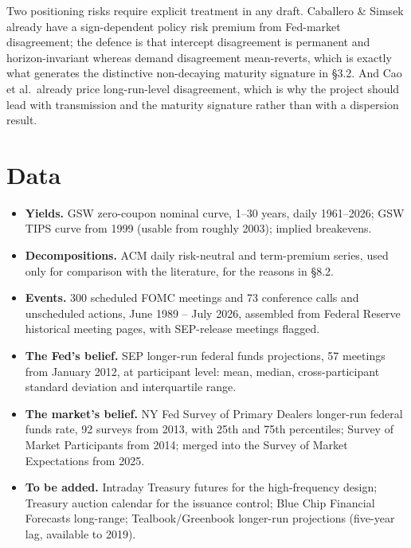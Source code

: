 \documentclass[11pt]{article}
\begin{document}
Two positioning risks require explicit treatment in any draft. Caballero \& Simsek already have
a sign-dependent policy risk premium from Fed-market disagreement; the defence is that
intercept disagreement is permanent and horizon-invariant whereas demand disagreement
mean-reverts, which is exactly what generates the distinctive non-decaying maturity signature
in \S3.2. And Cao et al.\ already price long-run-level disagreement, which is why the project
should lead with transmission and the maturity signature rather than with a dispersion result.

\section{Data}

\begin{itemize}\setlength\itemsep{0.1em}
\item \textbf{Yields.} GSW zero-coupon nominal curve, 1--30 years, daily 1961--2026; GSW TIPS
curve from 1999 (usable from roughly 2003); implied breakevens.
\item \textbf{Decompositions.} ACM daily risk-neutral and term-premium series, used only for
comparison with the literature, for the reasons in \S8.2.
\item \textbf{Events.} 300 scheduled FOMC meetings and 73 conference calls and unscheduled
actions, June 1989 -- July 2026, assembled from Federal Reserve historical meeting pages, with
SEP-release meetings flagged.
\item \textbf{The Fed's belief.} SEP longer-run federal funds projections, 57 meetings from
January 2012, at participant level: mean, median, cross-participant standard deviation and
interquartile range.
\item \textbf{The market's belief.} NY Fed Survey of Primary Dealers longer-run federal funds
rate, 92 surveys from 2013, with 25th and 75th percentiles; Survey of Market Participants from
2014; merged into the Survey of Market Expectations from 2025.
\item \textbf{To be added.} Intraday Treasury futures for the high-frequency design; Treasury
auction calendar for the issuance control; Blue Chip Financial Forecasts long-range;
Tealbook/Greenbook longer-run projections (five-year lag, available to 2019).
\end{itemize}

\end{document}
